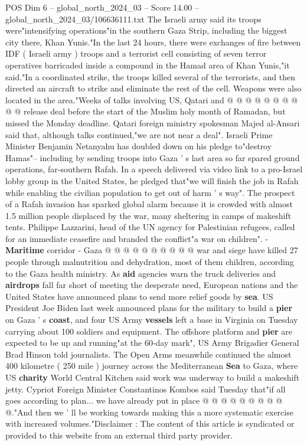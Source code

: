 \begin{textsample}{POS Dim 6 – global\_north\_2024\_03 – Score 14.00 – global\_north\_2024\_03/106636111.txt}
The Israeli army said its troops were"intensifying operations"in the southern Gaza Strip, including the biggest city there, Khan Yunis."In the last 24 hours, there were exchanges of fire between IDF ( Israeli army ) troops and a terrorist cell consisting of seven terror operatives barricaded inside a compound in the Hamad area of Khan Yunis,"it said."In a coordinated strike, the troops killed several of the terrorists, and then directed an aircraft to strike and eliminate the rest of the cell.
Weapons were also located in the area."Weeks of talks involving US, Qatari and @ @ @ @ @ @ @ @ @ @ release deal before the start of the Muslim holy month of Ramadan, but missed the Monday deadline.
Qatari foreign ministry spokesman Majed al-Ansari said that, although talks continued,"we are not near a deal".
Israeli Prime Minister Benjamin Netanyahu has doubled down on his pledge to"destroy Hamas"-- including by sending troops into Gaza ' s last area so far spared ground operations, far-southern Rafah.
In a speech delivered via video link to a pro-Israel lobby group in the United States, he pledged that"we will finish the job in Rafah while enabling the civilian population to get out of harm ' s way".
The prospect of a Rafah invasion has sparked global alarm because it is crowded with almost 1.5 million people displaced by the war, many sheltering in camps of makeshift tents.
Philippe Lazzarini, head of the UN agency for Palestinian refugees, called for an immediate ceasefire and branded the conflict"a war on children". - \textbf{Maritime} corridor - Gaza @ @ @ @ @ @ @ @ @ @ war and siege have killed 27 people through malnutrition and dehydration, most of them children, according to the Gaza health ministry.
As \textbf{aid} agencies warn the truck deliveries and \textbf{airdrops} fall far short of meeting the desperate need, European nations and the United States have announced plans to send more relief goods by \textbf{sea}.
US President Joe Biden last week announced plans for the military to build a \textbf{pier} on Gaza ' s \textbf{coast}, and four US Army \textbf{vessels} left a base in Virginia on Tuesday carrying about 100 soldiers and equipment.
The offshore platform and \textbf{pier} are expected to be up and running"at the 60-day mark", US Army Brigadier General Brad Hinson told journalists.
The Open Arms meanwhile continued the almost 400 kilometre ( 250 mile ) journey across the Mediterranean \textbf{Sea} to Gaza, where US \textbf{charity} World Central Kitchen said work was underway to build a makeshift jetty.
Cypriot Foreign Minister Constantinos Kombos said Tuesday that"if all goes according to plan... we have already put in place @ @ @ @ @ @ @ @ @ @."And then we ' ll be working towards making this a more systematic exercise with increased volumes."Disclaimer : The content of this article is syndicated or provided to this website from an external third party provider.

\end{textsample}
